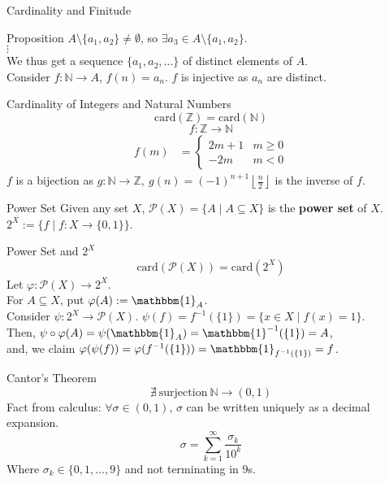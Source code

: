 \documentclass[10pt]{extarticle}
\begin{document}
\begin{problem}{Cardinality and Finitude}
\begin{problem}{Proposition}
      $A \setminus \{a_1,a_2\} \neq \emptyset$, so $\exists a_3\in A\setminus \{a_1,a_2\}$.\\

      $\vdots$\\

      We thus get a sequence $\{a_1,a_2,\dots\}$ of distinct elements of $A$.\\

      Consider $f:\mathbb{N} \rightarrow A$, $f(n) = a_n$. $f$ is injective as $a_n$ are distinct.
    \end{problem}
    \begin{problem}{Cardinality of Integers and Natural Numbers}
      \[
        \text{card}(\mathbb{Z}) = \text{card}(\mathbb{N})
      \] 
      \tcblower
      \[
        f:\mathbb{Z} \rightarrow \mathbb{N}
      \] 
      \begin{align*}
        f(m) &= \begin{cases}
          2m + 1 & m\geq 0\\
          -2m & m<0
        \end{cases}
      \end{align*}
      $f$ is a bijection as $g:\mathbb{N} \rightarrow \mathbb{Z},~g(n) = (-1)^{n+1}\left\lfloor \frac{n}{2}\right\rfloor$ is the inverse of $f$.
    \end{problem}
    \begin{problem}{Power Set}
      Given any set $X$, $\mathcal{P}(X) = \{A \mid A\subseteq X\}$ is the \textbf{power set} of $X$.\\

      $2^X:= \{f\mid f:X\rightarrow \{0,1\}\}$.
    \end{problem}
    \begin{problem}{Power Set and $2^{X}$}
      \[
        \text{card}(\mathcal{P}(X)) = \text{card}(2^X)
      \] 
      \tcblower
      Let $\varphi: \mathcal{P}(X) \rightarrow 2^X$.\\

      For $A\subseteq X$, put $\varphi(A) := \mathbbm{1}_A$.\\

      Consider $\psi: 2^X \rightarrow \mathcal{P}(X)$. $\psi(f) = f^{-1}(\{1\}) = \{x\in X \mid f(x) = 1\}$.\\

      Then, $\psi\circ\varphi(A) = \psi(\mathbbm{1}_A) = \mathbbm{1}^{-1}(\{1\}) = A$,\\

      and, we claim $\varphi(\psi(f)) = \varphi(f^{-1}(\{1\})) = \mathbbm{1}_{f^{-1}(\{1\})} = f$.
    \end{problem}
    \begin{problem}{Cantor's Theorem}
      \[
        \nexists~\text{surjection}~\mathbb{N}\rightarrow (0,1)
      \] 
      \tcblower
      Fact from calculus: $\forall \sigma\in (0,1)$, $\sigma$ can be written uniquely as a decimal expansion.
      \[
        \sigma = \sum_{k=1}^{\infty} \frac{\sigma_k}{10^k}
      \] 
      Where $\sigma_k\in \{0,1,\dots,9\}$ and not terminating in $9$s.\\


\end{problem}
\end{problem}
\end{document}
